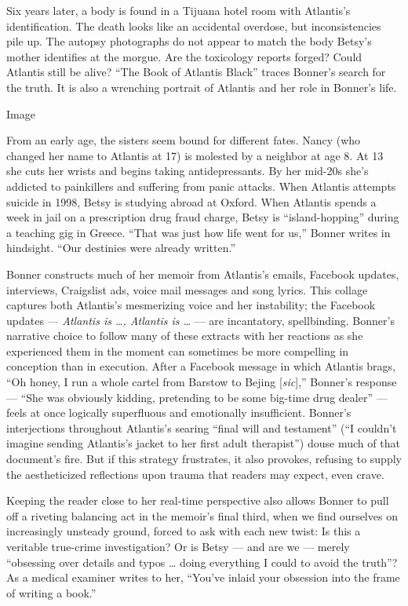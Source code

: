Six years later, a body is found in a Tijuana hotel room with Atlantis's
identification. The death looks like an accidental overdose, but
inconsistencies pile up. The autopsy photographs do not appear to match
the body Betsy's mother identifies at the morgue. Are the toxicology
reports forged? Could Atlantis still be alive? ``The Book of Atlantis
Black'' traces Bonner's search for the truth. It is also a wrenching
portrait of Atlantis and her role in Bonner's life.

Image

From an early age, the sisters seem bound for different fates. Nancy
(who changed her name to Atlantis at 17) is molested by a neighbor at
age 8. At 13 she cuts her wrists and begins taking antidepressants. By
her mid-20s she's addicted to painkillers and suffering from panic
attacks. When Atlantis attempts suicide in 1998, Betsy is studying
abroad at Oxford. When Atlantis spends a week in jail on a prescription
drug fraud charge, Betsy is ``island-hopping'' during a teaching gig in
Greece. ``That was just how life went for us,'' Bonner writes in
hindsight. ``Our destinies were already written.''

Bonner constructs much of her memoir from Atlantis's emails, Facebook
updates, interviews, Craigslist ads, voice mail messages and song
lyrics. This collage captures both Atlantis's mesmerizing voice and her
instability; the Facebook updates --- \emph{Atlantis is \ldots{},
Atlantis is \ldots{}} --- are incantatory, spellbinding. Bonner's
narrative choice to follow many of these extracts with her reactions as
she experienced them in the moment can sometimes be more compelling in
conception than in execution. After a Facebook message in which Atlantis
brags, ``Oh honey, I run a whole cartel from Barstow to Bejing
{[}\emph{sic}{]},'' Bonner's response --- ``She was obviously kidding,
pretending to be some big-time drug dealer'' --- feels at once logically
superfluous and emotionally insufficient. Bonner's interjections
throughout Atlantis's searing ``final will and testament'' (``I couldn't
imagine sending Atlantis's jacket to her first adult therapist'') douse
much of that document's fire. But if this strategy frustrates, it also
provokes, refusing to supply the aestheticized reflections upon trauma
that readers may expect, even crave.

Keeping the reader close to her real-time perspective also allows Bonner
to pull off a riveting balancing act in the memoir's final third, when
we find ourselves on increasingly unsteady ground, forced to ask with
each new twist: Is this a veritable true-crime investigation? Or is
Betsy --- and are we --- merely ``obsessing over details and typos
\ldots{} doing everything I could to avoid the truth''? As a medical
examiner writes to her, ``You've inlaid your obsession into the frame of
writing a book.''

